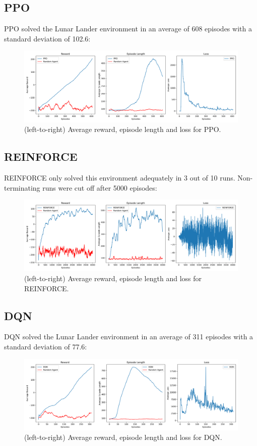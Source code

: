 \documentclass{article}
\begin{document}
\subsection{PPO}
PPO solved the Lunar Lander environment in an average of 608 episodes with a standard deviation of 102.6:
\begin{figure}[H]
  \centering
  \includegraphics[scale=0.35]{1.png}
  \caption{(left-to-right) Average reward, episode length and loss for PPO.}
\end{figure}
\subsection{REINFORCE}
REINFORCE only solved this environment adequately in 3 out of 10 runs. Non-terminating runs were cut off after 5000 episodes:
\begin{figure}[H]
  \centering
  \includegraphics[scale=0.35]{2.png}
  \caption{(left-to-right) Average reward, episode length and loss for REINFORCE.}
\end{figure}
\subsection{DQN}
DQN solved the Lunar Lander environment in an average of 311 episodes with a standard deviation of 77.6:
\begin{figure}[H]
  \centering
  \includegraphics[scale=0.35]{3.png}
  \caption{(left-to-right) Average reward, episode length and loss for DQN.}
\end{figure}
\end{document}
